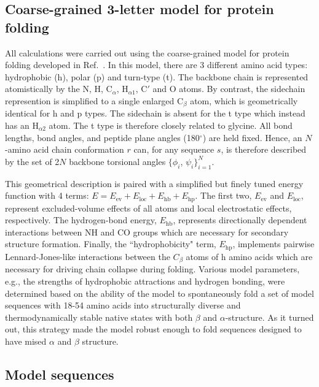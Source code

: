 \documentclass[%
 aip,
rsi,%
 amsmath,amssymb,
 reprint,%
]{revtex4-1}
\newcommand	 {\sbar}	{{s}}
\newcommand	 {\rbar}	{{r}}
\begin{document}
\subsection{Coarse-grained 3-letter model for protein folding}
\noindent
All calculations were carried out using the coarse-grained model for protein folding developed in Ref.~. In this model, there are 3 different amino acid types: hydrophobic (h), polar (p) and turn-type (t). The backbone chain is represented atomistically by the N, H, $\mathrm{C}_\alpha$, $\mathrm{H}_{\alpha 1}$, C$'$ and O atoms. By contrast, the sidechain represention is simplified to a single enlarged $\mathrm{C}_\beta$ atom, which is geometrically identical for h and p types. The sidechain is absent for the t type which instead has an $\mathrm{H}_{\alpha 2}$ atom. The t type is therefore closely related to glycine. All bond lengths, bond angles, and peptide plane angles (180$^\circ$) are held fixed. Hence, an $N$-amino acid chain conformation $\rbar$ can, for any sequence $\sbar$, is therefore described by the set of 2$N$ backbone torsional angles $\{\phi_i$, $\psi_i\}_{i=1}^{N}$. 
 
This geometrical description is paired with a simplified but finely tuned energy function with 4 terms: $E= E_\mathrm{ev} + E_\mathrm{loc} + E_\mathrm{hb} + E_\mathrm{hp}$. The first two, $E_\mathrm{ev}$ and $E_\mathrm{loc}$, represent excluded-volume effects of all atoms and local electrostatic effects, respectively. The hydrogen-bond energy, $E_\mathrm{hb}$, represents directionally dependent interactions between NH and CO groups which are necessary for secondary structure formation. Finally, the ``hydrophobicity" term, $E_\mathrm{hp}$, implements pairwise Lennard-Jones-like interactions between the $C_\beta$ atoms of h amino acids which are necessary for driving chain collapse during folding. Various model parameters, e.g., the strengths of hydrophobic attractions and hydrogen bonding, were determined based on the ability of the model to spontaneously fold a set of model sequences with 18-54 amino acids into  structurally diverse and thermodynamically stable native states with both $\beta$ and $\alpha$-structure. As it turned out, this strategy made the model robust enough to fold sequences designed to have mised $\alpha$ and $\beta$ structure. 

\subsection{Model sequences}
\end{document}

